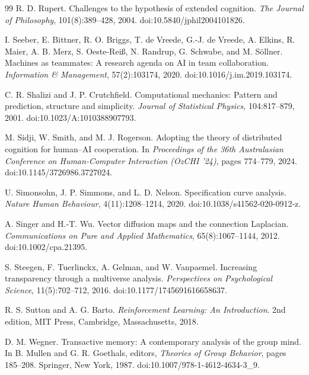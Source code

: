 \documentclass[11pt,oneside,openany]{book}
\numberwithin{equation}{section}
\begin{document}
\begin{thebibliography}{99}
R. D. Rupert.
\newblock Challenges to the hypothesis of extended cognition.
\newblock \emph{The Journal of Philosophy}, 101(8):389--428, 2004.
\newblock doi:10.5840/jphil2004101826.

I. Seeber, E. Bittner, R. O. Briggs, T. de Vreede, G.-J. de Vreede, A. Elkins, R. Maier, A. B. Merz, S. Oeste-Rei\ss, N. Randrup, G. Schwabe, and M. S\"ollner.
\newblock Machines as teammates: A research agenda on AI in team collaboration.
\newblock \emph{Information \& Management}, 57(2):103174, 2020.
\newblock doi:10.1016/j.im.2019.103174.

C. R. Shalizi and J. P. Crutchfield.
\newblock Computational mechanics: Pattern and prediction, structure and simplicity.
\newblock \emph{Journal of Statistical Physics}, 104:817--879, 2001.
\newblock doi:10.1023/A:1010388907793.

M. Sidji, W. Smith, and M. J. Rogerson.
\newblock Adopting the theory of distributed cognition for human--AI cooperation.
\newblock In \emph{Proceedings of the 36th Australasian Conference on Human-Computer Interaction (OzCHI '24)}, pages 774--779, 2024.
\newblock doi:10.1145/3726986.3727024.

U. Simonsohn, J. P. Simmons, and L. D. Nelson.
\newblock Specification curve analysis.
\newblock \emph{Nature Human Behaviour}, 4(11):1208--1214, 2020.
\newblock doi:10.1038/s41562-020-0912-z.

A. Singer and H.-T. Wu.
\newblock Vector diffusion maps and the connection Laplacian.
\newblock \emph{Communications on Pure and Applied Mathematics}, 65(8):1067--1144, 2012.
\newblock doi:10.1002/cpa.21395.

S. Steegen, F. Tuerlinckx, A. Gelman, and W. Vanpaemel.
\newblock Increasing transparency through a multiverse analysis.
\newblock \emph{Perspectives on Psychological Science}, 11(5):702--712, 2016.
\newblock doi:10.1177/1745691616658637.

R. S. Sutton and A. G. Barto.
\newblock \emph{Reinforcement Learning: An Introduction}.
\newblock 2nd edition, MIT Press, Cambridge, Massachusetts, 2018.

D. M. Wegner.
\newblock Transactive memory: A contemporary analysis of the group mind.
\newblock In B. Mullen and G. R. Goethals, editors, \emph{Theories of Group Behavior}, pages 185--208. Springer, New York, 1987.
\newblock doi:10.1007/978-1-4612-4634-3\_9.


\end{thebibliography}
\end{document}
